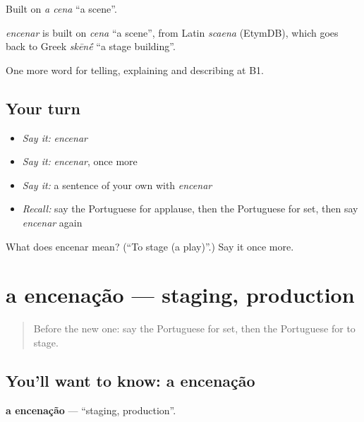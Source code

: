Built on \emph{a cena} \textquotedblleft{}a scene\textquotedblright{}.

\begin{cousinweb}
\emph{encenar} is built on \emph{cena} \textquotedblleft{}a scene\textquotedblright{}, from Latin \emph{scaena} (EtymDB), which goes back to Greek \emph{skēn\'{\={e}}} \textquotedblleft{}a stage building\textquotedblright{}.
\end{cousinweb}

\begin{grammarlens}[title={What you've built}]
One more word for telling, explaining and describing at B1.
\end{grammarlens}

\subsection*{Your turn}
\begin{itemize}
\raggedright
  \item \emph{Say it:} \emph{encenar}
  \item \emph{Say it:} \emph{encenar}, once more
  \item \emph{Say it:} a sentence of your own with \emph{encenar}
  \item \emph{Recall:} say the Portuguese for applause, then the Portuguese for set, then say \emph{encenar} again
\end{itemize}

\begin{tcolorbox}[breakable,colback=teal!4,colframe=teal!35!black,title={Before you move on}]
What does encenar mean? (\textquotedblleft{}To stage (a play)\textquotedblright{}.) Say it once more.
\end{tcolorbox}
\section[a encenação]{a encenação — staging, production}

\label{lesson:PT-C520-encenacao}



\begin{quote}
Before the new one: say the Portuguese for set, then the Portuguese for to stage.
\end{quote}

\subsection*{You'll want to know: a encenação}
\textbf{a encenação} — \textquotedblleft{}staging, production\textquotedblright{}.

